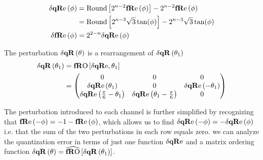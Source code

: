 \begin{align*}
\dqRe[\phi] &= \text{Round}\left[ 2^{n-2} \fRe[\phi ] \right]-2^{n-2}\fRe[\phi ] \\
&=  \text{Round}\left[ 2^{n-3}\sqrt{3} \tan (\phi ) \right]-2^{n-3}\sqrt{3} \tan (\phi )\\
\dfRe[\phi] &= 2^{2-n} \dqRe[\phi]  
\end{align*}

The perturbation $\dqR[\theta]$ is a rearrangement of $\dqR[\thetaA] $ 
\begin{align*}
\dqR[\thetaA] &= \fRO[\dqRe, \thetaA ] \\
 &=
\begin{pmatrix}
 0                                     & 0                                   & 0                     \\
 \dqRe[ \thetaA ]              & 0                                   & \dqRe[ -\thetaA ] \\
 \dqRe[ \Pii{6} -\thetaA]   & \dqRe[\thetaA-\Pii{6} ] & 0                     \\
\end{pmatrix}
\end{align*}

The perturbation introduced to each channel is further simplified by recognizing that $\fRe[-\phi]=-1-\fRe[\phi]$, which allows us to find $\dqRe[-\phi]=-\dqRe[\phi]$ i.e. that the sum of the two perturbations in each row equals zero. we can analyze the quantization error in terms of just one function $\dqRe$ and a matrix ordering function $\dqR[\theta] = \fROm \left[ \dqR[ \thetaA ]  \right]$.



